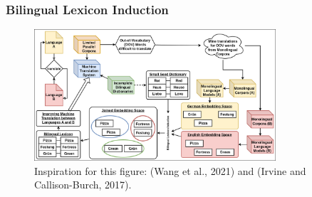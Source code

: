 \documentclass[aspectratio=169]{beamer}
\begin{document}
\begin{frame}[fragile]
	\frametitle{Bilingual Lexicon Induction}
    \begin{figure}
        \centering
        \includegraphics[width=0.8\textwidth]{images/ChameleonMT-BLI-BLI.png}
        \caption{Inspiration for this figure: (Wang et al., 2021) and (Irvine and Callison-Burch, 2017).}
    \end{figure}
\end{frame}
\end{document}
